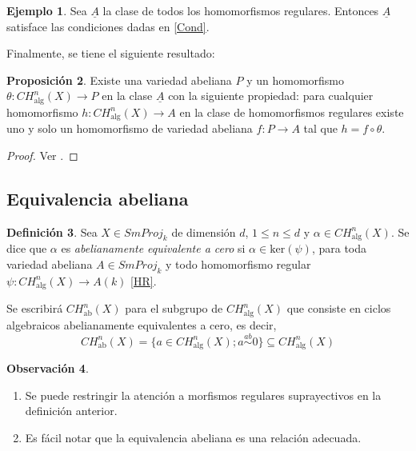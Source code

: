 \documentclass[10pt]{amsart}
\theoremstyle{definition}
\newtheorem{definition}{Definici\'on}[section]
\newtheorem{obs}[definition]{Observaci\'on}
\newtheorem{proposition}[definition]{Proposici\'on}
\theoremstyle{remark}
\theoremstyle{definition}
\newtheorem{ejem}[definition]{Ejemplo}
\begin{document}
\begin{ejem}
Sea $\underline{A}$ la clase de todos los homomorfismos regulares. Entonces $\underline{A}$ satisface las condiciones dadas en \ref{Cond}.
\end{ejem}


Finalmente, se tiene el siguiente resultado:
\begin{proposition}
Existe una variedad abeliana \(P\) y un homomorfismo \(\theta: CH_{\mathrm{alg}}^n(X) \to P\) en la clase $\underline{A}$  con la siguiente propiedad: para cualquier homomorfismo \(h: CH_{\mathrm{alg}}^n(X) \to A\) en la clase de homomorfismos regulares existe uno y solo un homomorfismo de variedad abeliana \(f: P \to A\) tal que \(h = f \circ \theta\).
\end{proposition}

\begin{proof}
Ver \cite[Prop. 2.1]{Sai79}.
\end{proof}



\subsection{Equivalencia abeliana}\label{EA}
\begin{definition}
Sea $X\in SmProj_{k}$ de dimensión $d$, $1\leq n\leq d$ y $\alpha\in CH^{n}_{\mathrm{alg}}(X)$. Se dice que $\alpha$ es \textit{abelianamente equivalente a cero} \cite[p. 477]{Sam60} si $\alpha\in\mathrm{ker}(\psi)$, para toda variedad abeliana $A\in SmProj_{k}$ y todo homomorfismo regular $\psi:CH^{n}_{\mathrm{alg}}(X)\to A(k)$ \ref{HR}.


Se escribirá $CH^{n}_{\mathrm{ab}}(X)$ para el subgrupo de $CH^{n}_{\mathrm{alg}}(X)$ que consiste en ciclos algebraicos abelianamente equivalentes a cero, es decir, 
\[ CH_{\mathrm{ab}}^n(X) = \{ a \in CH^{n}_{\mathrm{alg}}(X); a \stackrel{ab}{\sim} 0 \} \subseteq CH^{n}_{\mathrm{alg}}(X) \]
\end{definition}

\begin{obs}
\begin{enumerate}
\item Se puede restringir la atención a morfismos regulares suprayectivos en la definición anterior.
\item Es fácil notar que la equivalencia abeliana es una relación adecuada.
\end{enumerate}
\end{obs}
\end{document}
